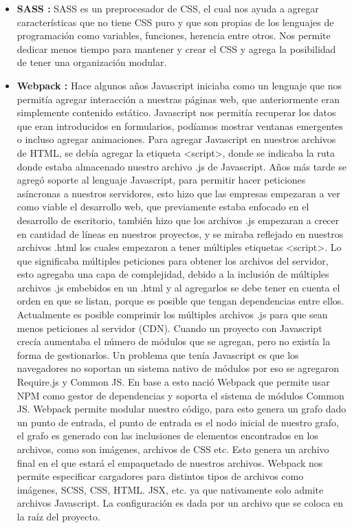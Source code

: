 \begin{itemize}
       \item \textbf{ SASS :} SASS es un preprocesador de CSS, el cual nos ayuda a agregar características que no tiene CSS puro y que son propias de los lenguajes de programación como variables, funciones, herencia entre otros. Nos permite dedicar menos tiempo para mantener y crear el CSS y agrega la posibilidad de tener una organización modular. 
       
       \item \textbf{ Webpack :} Hace algunos años Javascript iniciaba como un lenguaje que nos permitía agregar interacción a nuestras páginas web, que anteriormente eran simplemente contenido estático.  Javascript nos permitía recuperar los datos que eran introducidos en formularios, podíamos mostrar ventanas emergentes o incluso agregar animaciones. Para agregar Javascript en nuestros archivos de HTML, se debía agregar la etiqueta <script>, donde se indicaba la ruta donde estaba almacenado nuestro archivo .js de Javascript.  
    Años más tarde se agregó soporte al lenguaje Javascript, para permitir hacer peticiones asíncronas a nuestros servidores, esto hizo que las empresas empezaran a ver como viable el desarrollo web, que previamente estaba enfocado en el desarrollo de escritorio, también hizo que los archivos .js empezaran a crecer en cantidad de líneas en nuestros proyectos, y se miraba reflejado en nuestros archivos .html los cuales empezaron a tener múltiples etiquetas <script>. Lo que significaba múltiples peticiones para obtener los archivos del servidor, esto agregaba una capa de complejidad, debido a la inclusión de múltiples archivos .js embebidos en un .html y al agregarlos se debe tener en cuenta el orden en que se listan, porque es posible que tengan dependencias entre ellos. Actualmente es posible comprimir los múltiples archivos .js para que sean menos peticiones al servidor (CDN).  Cuando un proyecto con Javascript crecía aumentaba el número de módulos que se agregan, pero no existía la forma de gestionarlos. Un problema que tenía Javascript es que los navegadores no soportan un sistema nativo de módulos por eso se agregaron Require.js y Common JS. 
    En base a esto nació Webpack que permite usar NPM como gestor de dependencias y soporta el sistema de módulos Common JS.
    Webpack permite modular nuestro código, para esto genera un grafo dado un punto de entrada, el punto de entrada es el nodo inicial de nuestro grafo, el grafo es generado con las inclusiones de elementos encontrados en los archivos, como son imágenes, archivos de CSS etc. Esto genera un archivo final en el que estará el empaquetado de nuestros archivos. 
    Webpack nos permite especificar cargadores para distintos tipos de archivos como imágenes, SCSS, CSS, HTML. JSX, etc. ya que nativamente solo admite archivos Javascript. 
    La configuración es dada por un archivo que se coloca en la raíz del proyecto.
    

\end{itemize}
